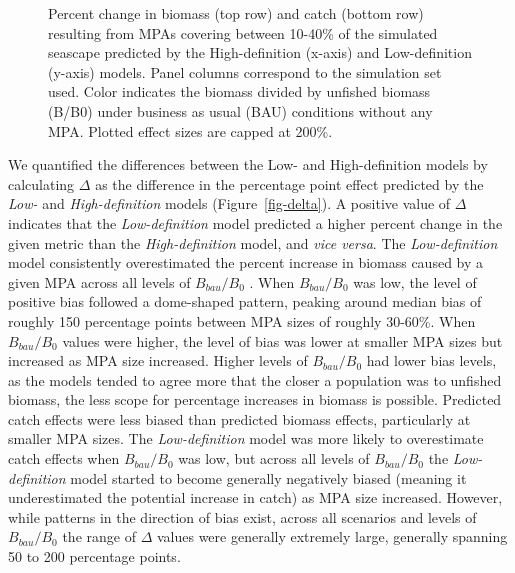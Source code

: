 \documentclass[
  default,
  lineno,
  referee]{sn-jnl}
\begin{document}
\begin{figure}


\caption{\label{fig-hi-v-low}Percent change in biomass (top row) and
catch (bottom row) resulting from MPAs covering between 10-40\% of the
simulated seascape predicted by the High-definition (x-axis) and
Low-definition (y-axis) models. Panel columns correspond to the
simulation set used. Color indicates the biomass divided by unfished
biomass (B/B0) under business as usual (BAU) conditions without any MPA.
Plotted effect sizes are capped at 200\%.}

\end{figure}%

We quantified the differences between the Low- and High-definition
models by calculating \(\Delta\) as the difference in the percentage
point effect predicted by the \emph{Low-} and \emph{High-definition}
models (Figure~\ref{fig-delta}). A positive value of \(\Delta\)
indicates that the \emph{Low-definition} model predicted a higher
percent change in the given metric than the \emph{High-definition}
model, and \emph{vice versa}. The \emph{Low-definition} model
consistently overestimated the percent increase in biomass caused by a
given MPA across all levels of \(B_{bau}/B_0\) . When \(B_{bau}/B_0\)
was low, the level of positive bias followed a dome-shaped pattern,
peaking around median bias of roughly 150 percentage points between MPA
sizes of roughly 30-60\%. When \(B_{bau}/B_0\) values were higher, the
level of bias was lower at smaller MPA sizes but increased as MPA size
increased. Higher levels of \(B_{bau}/B_0\) had lower bias levels, as
the models tended to agree more that the closer a population was to
unfished biomass, the less scope for percentage increases in biomass is
possible. Predicted catch effects were less biased than predicted
biomass effects, particularly at smaller MPA sizes. The
\emph{Low-definition} model was more likely to overestimate catch
effects when \(B_{bau}/B_0\) was low, but across all levels of
\(B_{bau}/B_0\) the \emph{Low-definition} model started to become
generally negatively biased (meaning it underestimated the potential
increase in catch) as MPA size increased. However, while patterns in the
direction of bias exist, across all scenarios and levels of
\(B_{bau}/B_0\) the range of \(\Delta\) values were generally extremely
large, generally spanning 50 to 200 percentage points.
\end{document}
